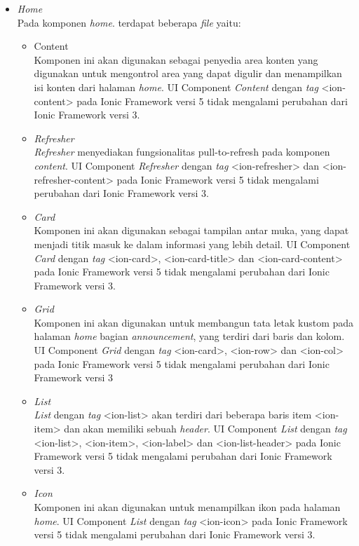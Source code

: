 \begin{itemize}
	\item \textit{Home}\\
	Pada komponen \textit{home}. terdapat beberapa \textit{file} yaitu:
		\begin{itemize}
			\item Content \\
		Komponen ini akan digunakan sebagai penyedia area konten yang digunakan untuk mengontrol area yang dapat digulir dan menampilkan isi konten dari halaman \textit{home}. UI Component \textit{Content} dengan \textit{tag} <ion-content> pada Ionic Framework versi 5 tidak mengalami perubahan dari Ionic Framework versi 3.
			\item \textit{Refresher} \\
		\textit{Refresher} menyediakan fungsionalitas  pull-to-refresh pada komponen \textit{content}. UI Component \textit{Refresher} dengan \textit{tag} <ion-refresher> dan <ion-refresher-content> pada Ionic Framework versi 5 tidak mengalami perubahan dari Ionic Framework versi 3.
			\item \textit{Card} \\
			Komponen ini akan digunakan sebagai tampilan antar muka, yang dapat menjadi titik masuk ke dalam informasi yang lebih detail. UI Component \textit{Card} dengan \textit{tag} <ion-card>, <ion-card-title> dan <ion-card-content> pada Ionic Framework versi 5 tidak mengalami perubahan dari Ionic Framework versi 3.

		
			
			\item \textit{Grid} \\
			Komponen ini akan digunakan untuk membangun tata letak kustom pada halaman \textit{home} bagian \textit{announcement}, yang terdiri dari baris dan kolom. UI Component \textit{Grid} dengan \textit{tag} <ion-card>, <ion-row> dan <ion-col> pada Ionic Framework versi 5 tidak mengalami perubahan dari Ionic Framework versi 3
			\item \textit{List} \\
			\textit{List}  dengan \textit{tag} <ion-list> akan terdiri dari beberapa baris item <ion-item> dan akan memiliki sebuah \textit{header}. UI Component \textit{List} dengan \textit{tag} <ion-list>, <ion-item>, <ion-label> dan <ion-list-header> pada Ionic Framework versi 5 tidak mengalami perubahan dari Ionic Framework versi 3.
			\item \textit{Icon} \\
			Komponen ini akan digunakan untuk menampilkan ikon pada halaman \textit{home}. UI Component \textit{List} dengan \textit{tag} <ion-icon> pada Ionic Framework versi 5 tidak mengalami perubahan dari Ionic Framework versi 3.


\end{itemize}
\end{itemize}
